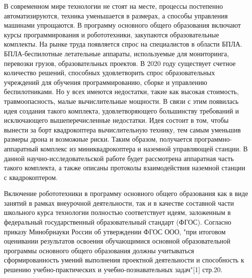 В современном мире технологии не стоят на месте, процессы постепенно автоматизируются, техника уменьшается в размерах, а способы управления машинами упрощаются. В программу основного общего образования включают курсы программирования и робототехники, закупаются образовательные комплекты. На рынке труда появляется спрос на специалистов в области БПЛА. БПЛА-беспилотные летательные аппараты, используемые для мониторинга, перевозки грузов, образовательных проектов. В 2020 году существует счетное количество решений, способных удовлетворить спрос образовательных учреждений для обучения программированию, сборке и управлению беспилотниками. Но у всех имеются недостатки, такие как высокая стоимость, травмоопасность, малые вычислительные мощности. В связи с этим появилась идея создания такого комплекта, удовлетворяющего большинству требований и исключающего вышеперечисленные недостатки. Идея состоит в том, чтобы вынести за борт квадрокоптера вычислительную технику, тем самым уменьшив размеры дрона и возможные риски. Таким образом, получается программно-аппаратный комплекс из миниквадрокоптера и наземной управляющей станции. 
В данной научно-исследовательской работе будет рассмотрена аппаратная часть такого комплекта, а также описаны протоколы взаимодействия наземной станции с квадрокоптером.


Включение робототехники в программу основного общего образования как в виде занятий в рамках внеурочной деятельности, так и в качестве составной части школьного курса технологии полностью соответствует идеям, заложенным в федеральный государственный образовательный стандарт (ФГОС). Согласно приказу Минобрнауки России об утверждении ФГОС ООО, "при итоговом оценивании результатов освоения обучающимися основной образовательной программы основного общего образования должны учитываться сформированность умений выполнения проектной деятельности и способность к решению учебно-практических и учебно-познавательных задач"[1] стр.20.
